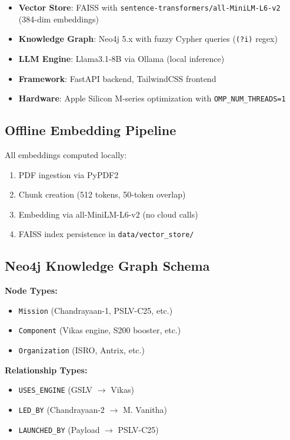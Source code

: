 \documentclass[journal,12pt,twocolumn]{IEEEtran}
\begin{document}
\begin{itemize}
\item \textbf{Vector Store}: FAISS with \texttt{sentence-transformers/all-MiniLM-L6-v2} (384-dim embeddings)
\item \textbf{Knowledge Graph}: Neo4j 5.x with fuzzy Cypher queries (\texttt{(?i)} regex)
\item \textbf{LLM Engine}: Llama3.1-8B via Ollama (local inference)
\item \textbf{Framework}: FastAPI backend, TailwindCSS frontend
\item \textbf{Hardware}: Apple Silicon M-series optimization with \texttt{OMP\_NUM\_THREADS=1}
\end{itemize}

\subsection{Offline Embedding Pipeline}

All embeddings computed locally:
\begin{enumerate}
\item PDF ingestion via PyPDF2
\item Chunk creation (512 tokens, 50-token overlap)
\item Embedding via all-MiniLM-L6-v2 (no cloud calls)
\item FAISS index persistence in \texttt{data/vector\_store/}
\end{enumerate}

\subsection{Neo4j Knowledge Graph Schema}

\textbf{Node Types:}
\begin{itemize}
\item \texttt{Mission} (Chandrayaan-1, PSLV-C25, etc.)
\item \texttt{Component} (Vikas engine, S200 booster, etc.)
\item \texttt{Organization} (ISRO, Antrix, etc.)
\end{itemize}

\textbf{Relationship Types:}
\begin{itemize}
\item \texttt{USES\_ENGINE} (GSLV $\rightarrow$ Vikas)
\item \texttt{LED\_BY} (Chandrayaan-2 $\rightarrow$ M. Vanitha)
\item \texttt{LAUNCHED\_BY} (Payload $\rightarrow$ PSLV-C25)
\end{itemize}
\end{document}
